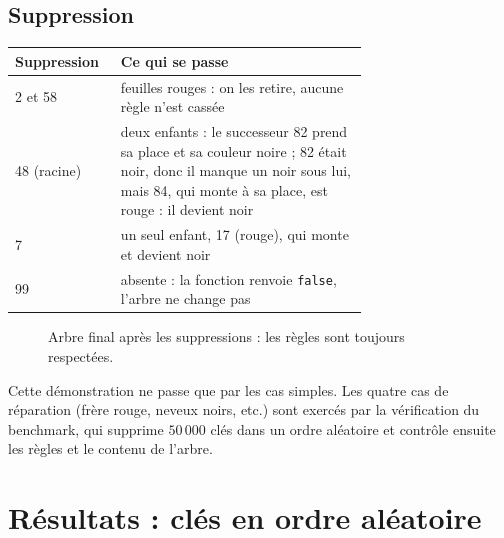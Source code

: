 \documentclass[12pt,a4paper]{report}
\begin{document}
\section{Suppression}
\begin{center}
\small
\begin{tabular}{lp{0.70\linewidth}}
  \toprule
  Suppression & Ce qui se passe \\
  \midrule
  2 et 58 & feuilles rouges : on les retire, aucune règle n'est cassée \\
  48 (racine) & deux enfants : le successeur 82 prend sa place et sa couleur noire ; 82 était noir, donc il manque un noir sous lui, mais 84, qui monte à sa place, est rouge : il devient noir \\
  7 & un seul enfant, 17 (rouge), qui monte et devient noir \\
  99 & absente : la fonction renvoie \texttt{false}, l'arbre ne change pas \\
  \bottomrule
\end{tabular}
\end{center}

\begin{figure}[H]
\centering
{}
\caption{Arbre final après les suppressions : les règles sont toujours respectées.}
\end{figure}
Cette démonstration ne passe que par les cas simples. Les quatre cas de réparation (frère rouge, neveux noirs, etc.) sont exercés par la vérification du benchmark, qui supprime $50\,000$ clés dans un ordre aléatoire et contrôle ensuite les règles et le contenu de l'arbre.

\chapter{Résultats : clés en ordre aléatoire}
\end{document}
